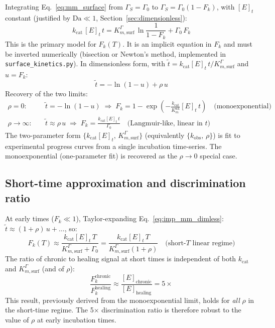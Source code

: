 \documentclass[10pt,a4paper]{article}
\numberwithin{equation}{section}
\newcommand{\kcat}{k_{\text{cat}}}
\newcommand{\GS}{\Gamma_S}
\newcommand{\Gz}{\Gamma_0}
\newcommand{\Da}{\mathrm{Da}}
\begin{document}
Integrating Eq.~\eqref{eq:mm_surface} from $\GS = \Gz$ to
$\GS = \Gz(1-F_k)$, with $[E]_t$ constant (justified by $\Da \ll 1$,
Section~\ref{sec:dimensionless}):
\begin{equation}
  \boxed{
  \kcat\,[E]_t\,t
  = K_{m,\text{surf}}^\Gamma\,\ln\!\frac{1}{1-F_k}
  + \Gz\,F_k
  }
  \label{eq:imp_mm}
\end{equation}
This is the primary model for $F_k(T)$. It is an implicit equation in $F_k$
and must be inverted numerically (bisection or Newton's method, implemented in
\texttt{surface\_kinetics.py}). In dimensionless form, with
$\tilde{t} = \kcat[E]_t\,t/K_{m,\text{surf}}^\Gamma$ and $u = F_k$:
\begin{equation}
  \tilde{t} = -\ln(1-u) + \rho\,u
  \label{eq:imp_mm_dimless}
\end{equation}
Recovery of the two limits:
\begin{align}
  \rho = 0:\quad &\tilde{t} = -\ln(1-u)
    \;\Rightarrow\; F_k = 1 - \exp\!\left(-\frac{\kcat}{K_m^{\text{sol}}}[E]_t\,t\right)
    \quad \text{(monoexponential)} \label{eq:limit_mono}\\[0.3em]
  \rho \to \infty:\quad &\tilde{t} \approx \rho\,u
    \;\Rightarrow\; F_k = \frac{\kcat[E]_t\,t}{\Gz}
    \quad \text{(Langmuir-like, linear in }t\text{)} \label{eq:limit_lang}
\end{align}
The two-parameter form $\{\kcat[E]_t,\,K_{m,\text{surf}}^\Gamma\}$ (equivalently
$\{k_{\text{obs}},\,\rho\}$) is fit to experimental progress curves from a
single incubation time-series. The monoexponential (one-parameter fit) is
recovered as the $\rho \to 0$ special case.

\subsection{Short-time approximation and discrimination ratio}

At early times ($F_k \ll 1$), Taylor-expanding Eq.~\eqref{eq:imp_mm_dimless}:
$\tilde{t} \approx (1+\rho)\,u + \ldots$, so:
\begin{equation}
  F_k(T) \approx \frac{\kcat[E]_t\,T}{K_{m,\text{surf}}^\Gamma + \Gz}
  = \frac{\kcat[E]_t\,T}{K_{m,\text{surf}}^\Gamma(1 + \rho)}
  \quad \text{(short-}T\text{ linear regime)}
  \label{eq:short_time}
\end{equation}
The ratio of chronic to healing signal at short times is independent of both
$\kcat$ and $K_{m,\text{surf}}^\Gamma$ (and of $\rho$):
\begin{equation}
  \frac{F_k^{\text{chronic}}}{F_k^{\text{healing}}} \approx
  \frac{[E]_{\text{chronic}}}{[E]_{\text{healing}}} = 5\times
  \label{eq:ratio_rho}
\end{equation}
This result, previously derived from the monoexponential limit, holds
for \emph{all} $\rho$ in the short-time regime. The 5$\times$ discrimination
ratio is therefore robust to the value of $\rho$ at early incubation times.
\end{document}
